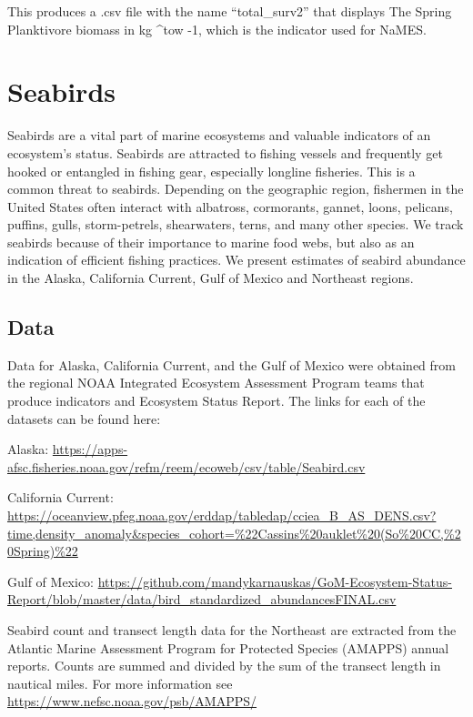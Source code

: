 \documentclass[
]{book}
\begin{document}
This produces a .csv file with the name ``total\_surv2'' that displays The Spring Planktivore biomass in kg \^{}tow -1, which is the indicator used for NaMES.

\hypertarget{seabirds}{%
\chapter{Seabirds}\label{seabirds}}

Seabirds are a vital part of marine ecosystems and valuable indicators of an ecosystem's status. Seabirds are attracted to fishing vessels and frequently get hooked or entangled in fishing gear, especially longline fisheries. This is a common threat to seabirds. Depending on the geographic region, fishermen in the United States often interact with albatross, cormorants, gannet, loons, pelicans, puffins, gulls, storm-petrels, shearwaters, terns, and many other species. We track seabirds because of their importance to marine food webs, but also as an indication of efficient fishing practices. We present estimates of seabird abundance in the Alaska, California Current, Gulf of Mexico and Northeast regions.

\hypertarget{data-3}{%
\section{Data}\label{data-3}}

Data for Alaska, California Current, and the Gulf of Mexico were obtained from the regional NOAA Integrated Ecosystem Assessment Program teams that produce indicators and Ecosystem Status Report. The links for each of the datasets can be found here:

Alaska: \url{https://apps-afsc.fisheries.noaa.gov/refm/reem/ecoweb/csv/table/Seabird.csv}

California Current: \url{https://oceanview.pfeg.noaa.gov/erddap/tabledap/cciea_B_AS_DENS.csv?time,density_anomaly\&species_cohort=\%22Cassins\%20auklet\%20(So\%20CC,\%20Spring)\%22}

Gulf of Mexico: \url{https://github.com/mandykarnauskas/GoM-Ecosystem-Status-Report/blob/master/data/bird_standardized_abundancesFINAL.csv}

Seabird count and transect length data for the Northeast are extracted from the Atlantic Marine Assessment Program for Protected Species (AMAPPS) annual reports. Counts are summed and divided by the sum of the transect length in nautical miles. For more information see \url{https://www.nefsc.noaa.gov/psb/AMAPPS/}
\end{document}
